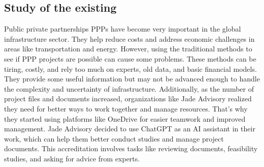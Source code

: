 \subsection{Study of the existing}
Public private partnerships PPPs have become very important in the global infrastructure sector. They help reduce costs and address economic challenges in areas like transportation and energy.
\vskip 0.5cm
However, using the traditional methods to see if PPP projects are possible can cause some problems. These methods can be tiring, costly, and rely too much on experts, old data, and basic financial models. They provide some useful information but may not be advanced enough to handle the complexity and uncertainty of infrastructure.
\vskip 0.5cm
Additionally, as the number of project files and documents increased, organizations like Jade Advisory realized they need for better ways to work together and manage resources. That's why they started using platforms like OneDrive for easier teamwork and improved management. Jade Advisory decided to use ChatGPT as an AI assistant in their work, which can help them better conduct studies and manage project documents. This accreditation involves tasks like reviewing documents, feasibility studies, and asking for advice from experts.
